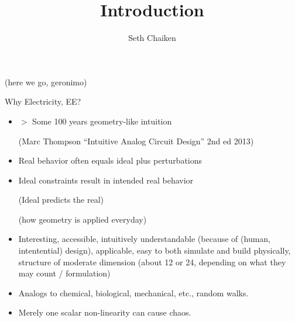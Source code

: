 \documentclass{article}
\title{Introduction}
\author{Seth Chaiken}
\begin{document}
\maketitle

(here we go, geronimo)

Why Electricity, EE?
\begin{itemize}
\item $>$ Some 100 years geometry-like intuition

(Marc Thompson ``Intuitive Analog Circuit Design'' 2nd ed 2013)

\item
Real behavior often equals ideal plus perturbations

\item
Ideal constraints result in intended real behavior

(Ideal predicts the real)

(how geometry is applied everyday)

\item 
Interesting, accessible, intuitively understandable
(because of (human, intentential) design), applicable,
easy to both simulate and build physically, structure of moderate
dimension (about 12 or 24, depending on what they may count / formulation)
\item
Analogs to chemical, biological, mechanical, etc., random walks.
\item
Merely one scalar non-linearity can cause chaos.
\end{itemize}
\end{document}
